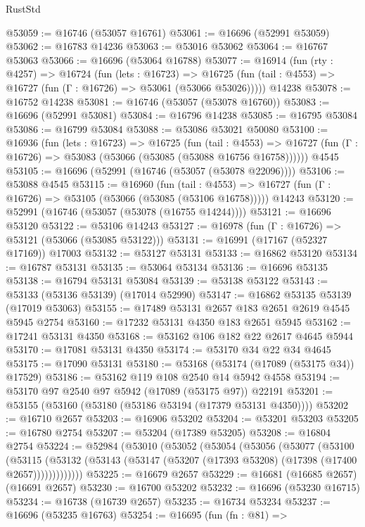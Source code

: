 \begin{lexlean}{RustStd}
\begin{coremodule}
@53059 := @16746 (@53057 @16761)
@53061 := @16696 (@52991 @53059)
@53062 := @16783 @14236
@53063 := @53016 @53062
@53064 := @16767 @53063
@53066 := @16696 (@53064 @16788)
@53077 := @16914
    (fun (rty : @4257) =>
    @16724
      (fun (lets : @16723) =>
      @16725 (fun (tail : @4553) => @16727 (fun (Γ : @16726) => @53061 (@53066 @53026)))))
    @14238
@53078 := @16752 @14238
@53081 := @16746 (@53057 (@53078 @16760))
@53083 := @16696 (@52991 @53081)
@53084 := @16796 @14238
@53085 := @16795 @53084
@53086 := @16799 @53084
@53088 := @53086 @53021 @50080
@53100 := @16936
    (fun (lets : @16723) =>
    @16725
      (fun (tail : @4553) =>
      @16727 (fun (Γ : @16726) => @53083 (@53066 (@53085 (@53088 @16756 @16758))))))
    @4545
@53105 := @16696 (@52991 (@16746 (@53057 (@53078 @22096))))
@53106 := @53088 @4545
@53115 := @16960
    (fun (tail : @4553) => @16727 (fun (Γ : @16726) => @53105 (@53066 (@53085 (@53106 @16758)))))
    @14243
@53120 := @52991 (@16746 (@53057 (@53078 (@16755 @14244))))
@53121 := @16696 @53120
@53122 := @53106 @14243
@53127 := @16978 (fun (Γ : @16726) => @53121 (@53066 (@53085 @53122)))
@53131 := @16991 (@17167 (@52327 @17169)) @17003
@53132 := @53127 @53131
@53133 := @16862 @53120
@53134 := @16787 @53131
@53135 := @53064 @53134
@53136 := @16696 @53135
@53138 := @16794 @53131 @53084
@53139 := @53138 @53122
@53143 := @53133 (@53136 @53139) (@17014 @52990)
@53147 := @16862 @53135 @53139 (@17019 @53063)
@53155 := @17489 @53131 @2657 @183 @2651 @2619 @4545 @5945 @2754
@53160 := @17232 @53131 @4350 @183 @2651 @5945
@53162 := @17241 @53131 @4350
@53168 := @53162 @106 @182 @22 @2617 @4645 @5944
@53170 := @17081 @53131 @4350
@53174 := @53170 @34 @22 @34 @4645
@53175 := @17090 @53131
@53180 := @53168 (@53174 (@17089 (@53175 @34)) @17529)
@53186 := @53162 @119 @108 @2540 @14 @5942 @4558
@53194 := @53170 @97 @2540 @97 @5942 (@17089 (@53175 @97)) @22191
@53201 := @53155 (@53160 (@53180 (@53186 @53194 (@17379 @53131 @4350))))
@53202 := @16710 @2657
@53203 := @16906 @53202
@53204 := @53201 @53203
@53205 := @16780 @2754
@53207 := @53204 (@17389 @53205)
@53208 := @16804 @2754
@53224 := @52984
    (@53010
      (@53052
        (@53054
          (@53056
            (@53077
              (@53100
                (@53115
                  (@53132 (@53143 (@53147 (@53207 (@17393 @53208) (@17398 (@17400 @2657)))))))))))))
@53225 := @16679 @2657
@53229 := @16681 (@16685 @2657) (@16691 @2657)
@53230 := @16700 @53202
@53232 := @16696 (@53230 @16715)
@53234 := @16738 (@16739 @2657)
@53235 := @16734 @53234
@53237 := @16696 (@53235 @16763)
@53254 := @16695
    (fun (fn : @81) =>

\end{coremodule}
\end{lexlean}
